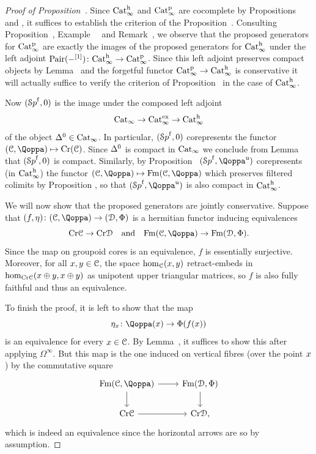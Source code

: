 \begin{proof}[Proof of Proposition~]
Since $\mathrm{Cat}^\mathrm{h}_\infty$ and $\mathrm{Cat}^{\mathrm p}_\infty$ are cocomplete by Propositions~ and ,
it suffices to establish the criterion of the Proposition~. 
Consulting Proposition~, Example~~ and Remark~, we observe that the proposed generators for $\mathrm{Cat}^{\mathrm p}_\infty$ are exactly the images of the proposed generators for $\mathrm{Cat}^\mathrm{h}_\infty$ under the left adjoint 
$\operatorname{Pair}(-^{[1]})\colon \mathrm{Cat}^\mathrm{h}_\infty \to \mathrm{Cat}^{\mathrm p}_\infty$. 
Since this left adjoint preserves compact objects by Lemma~ and the forgetful functor $\mathrm{Cat}^{\mathrm p}_\infty \to \mathrm{Cat}^\mathrm{h}_\infty$ is conservative it will actually suffice to verify the criterion of Proposition~ in the case of $\mathrm{Cat}^\mathrm{h}_\infty$. 



Now $({\mathcal Sp}^{\mathrm{f}},0)$ is the image under the composed left adjoint
\[
\mathrm{Cat}_\infty \to \mathrm{Cat}_\infty^{\mathrm{ex}} \to \mathrm{Cat}^\mathrm{h}_\infty
\]
of the object $\Delta^0 \in \mathrm{Cat}_\infty$. In particular, $({\mathcal Sp}^{\mathrm{f}},0)$ corepresents the functor $(\C,\QF) \mapsto \core(\C)$. Since $\Delta^0$ is compact in $\mathrm{Cat}_\infty$ we conclude from Lemma~ that $({\mathcal Sp}^{\mathrm{f}},0)$ is compact. Similarly, by Proposition~ $(\Spaf,\QF^{\uni})$ corepresents (in $\mathrm{Cat}^\mathrm{h}_\infty$) the functor $(\C,\QF) \mapsto \spsforms(\C,\QF)$ which preserves filtered colimits by Proposition , so that $(\Spaf,\QF^{\uni})$ is also compact in $\mathrm{Cat}^\mathrm{h}_\infty$.

We will now show that the proposed generators are jointly conservative. 
Suppose that $(f,\eta)\colon(\C,\QF)\to (\D,\QFD)$ is a hermitian functor inducing equivalences 
\[
\core\C \rightarrow \core\D \quad \text{and} \quad \spsforms(\C,\QF)\rightarrow \spsforms(\D,\QFD).
\]
Since the map on groupoid cores is an equivalence, $f$ is essentially surjective. Moreover, for all $x,y\in\mathcal C$, the space $\operatorname{hom}_\mathcal C(x,y)$ retract-embeds in $\operatorname{hom}_{\mathrm{Cr}\mathcal C}(x\oplus y,x \oplus y)$ as unipotent upper triangular matrices, so $f$ is also fully faithful and thus an equivalence. 



To finish the proof, it is left to show that the map
\[
\eta_{\x} \colon \QF(\x)\to \QFD(f(\x))
\]
is an equivalence for every $x\in \mathcal C$. By Lemma~,
it suffices to show this after applying $\Omega^\infty$. %
But this map is the one induced on vertical fibres (over the point $x$) by the commutative square
\[
\begin{tikzcd}
	\spsforms(\C,\QF)\ar[r]\ar[d] & \spsforms(\D,\QFD)\ar[d]\\
 	\core\C\ar[r] & \core\D,
 \end{tikzcd}
\]
which is indeed an equivalence since the horizontal arrows are so by assumption.
\end{proof}


